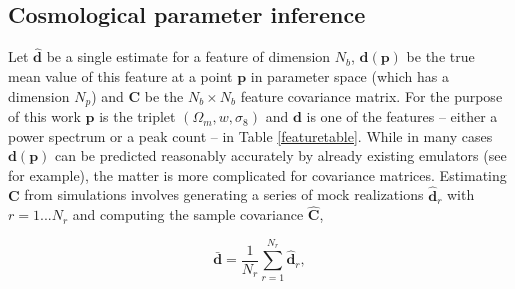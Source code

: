 \documentclass[reprint,aps,prd,superscriptaddress,showkeys,showpacs]{revtex4-1}
\newcommand{\bb}[1]{\mathbf{#1}}
\newcommand{\bbh}[1]{\mathbf{\hat{#1}}}
\begin{document}



\subsection{Cosmological parameter inference}
%

Let $\bbh{d}$ be a single estimate for a feature of dimension $N_b$, 
$\bb{d}(\bb{p})$ be the
true mean value of this feature at a point $\bb{p}$ in parameter space
(which has a dimension $N_p$) and $\bb{C}$ be the $N_b\times N_b$
feature covariance matrix. For the purpose of this work $\bb{p}$ is
the triplet $(\Omega_m,w,\sigma_8)$ and $\bb{d}$ is one of the
features -- either a power spectrum or a peak count -- in Table
\ref{featuretable}. While in many cases $\bb{d}(\bb{p})$ can be
predicted reasonably accurately by already existing emulators (see
\citep{coyote2,Nicaea} for example), the matter is more complicated
for covariance matrices.
Estimating $\bb{C}$ from simulations involves generating a series of
mock realizations $\bbh{d}_r$ with $r=1...N_r$ and computing the
sample covariance $\bbh{C}$,

\begin{equation}
\bb{\bar{d}} = \frac{1}{N_r}\sum_{r=1}^{N_r} \bbh{d}_r,
\end{equation}
\end{document}
